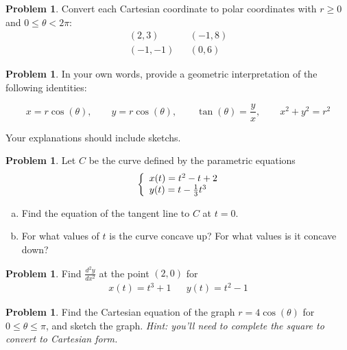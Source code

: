 \documentclass[10pt]{article}
\theoremstyle{definition}
\newtheorem{problem}[theorem]{Problem}
\newcommand{\1}[1]{\textbf{1}_{\left[#1\right]}} %
\begin{document}
\begin{problem}
  Convert each Cartesian coordinate to polar coordinates
  with $r\ge0$ and $0\le\theta<2\pi$:
  \begin{align*}
    (2,3)&&(-1,8)\\
    (-1,-1)&&(0,6)
  \end{align*}
\end{problem}


\begin{problem}
  In your own words, provide a geometric interpretation of the following
  identities:

  \begin{equation*}
    x = r \cos(\theta), \qquad y = r\cos(\theta), \qquad \tan(\theta) = \frac{y}{x}, \qquad x^{2}+y^{2}=r^{2}
  \end{equation*}

  Your explanations should include sketchs.
\end{problem}





\begin{problem}
  Let $C$ be the curve defined by the parametric equations
  \begin{equation*}
    \left\{ \begin{array}{l@{}l} x(t) = t^{2}-t+2 \\ y(t) = t-\frac{1}{3}t^{3} \end{array}\right.
  \end{equation*}
  \begin{enumerate}[(a)]
    \item Find the equation of the tangent line to $C$ at $t=0$.
    \item For what values of $t$ is the curve concave up? For what values is it concave down?
  \end{enumerate}
\end{problem}


\begin{problem}
  Find $\frac{d^2y}{dx^2}$ at the point $(2,0)$ for
  \begin{align*}
    x(t)=t^3+1&&y(t)=t^2-1
  \end{align*}
\end{problem}

\begin{problem}
  Find the Cartesian equation of the graph $r=4\cos(\theta)$ for $0 \leq \theta \leq \pi$, and sketch
  the graph. \textit{Hint: you'll need to complete the square to convert to Cartesian form.}
\end{problem}
\end{document}
